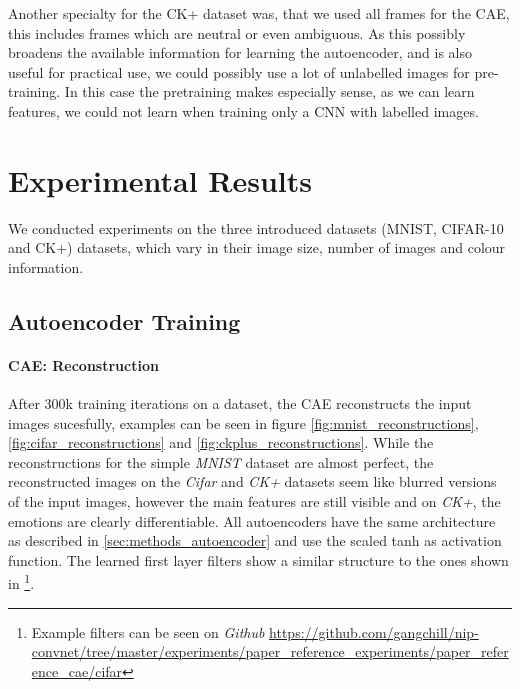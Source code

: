 \documentclass{article}
\begin{document}
      Another specialty for the CK+ dataset was, that we used all frames for the CAE, this includes frames which are neutral or even ambiguous.
      As this possibly broadens the available information for learning the autoencoder, and is also useful for practical use, we could possibly
      use a lot of unlabelled images for pre-training. In this case the pretraining makes especially sense, as we can learn features,
      we could not learn when training only a CNN with labelled images.


\section{Experimental Results}
  We conducted experiments on the three introduced datasets (MNIST, CIFAR-10 and CK+) datasets, which vary in their image size, number of images and colour information.

  
  \subsection{Autoencoder Training}


    \paragraph{CAE: Reconstruction}

    After 300k training iterations on a dataset, the CAE reconstructs the input images sucesfully, examples can be seen in figure \ref{fig:mnist_reconstructions}, \ref{fig:cifar_reconstructions} and \ref{fig:ckplus_reconstructions}. While the reconstructions for the simple \emph{MNIST} dataset are almost perfect, the reconstructed images on the \emph{Cifar} and \emph{CK+} datasets seem like blurred versions of the input images, however the main features are still visible and on \emph{CK+}, the emotions are clearly differentiable. All autoencoders have the same architecture as described in \ref{sec:methods_autoencoder} and use the scaled tanh as activation function. The learned first layer filters show a similar structure to the ones shown in \citep{masci11}\footnote{Example filters can be seen on \emph{Github} \url{https://github.com/gangchill/nip-convnet/tree/master/experiments/paper_reference_experiments/paper_reference_cae/cifar}}. 
\end{document}
